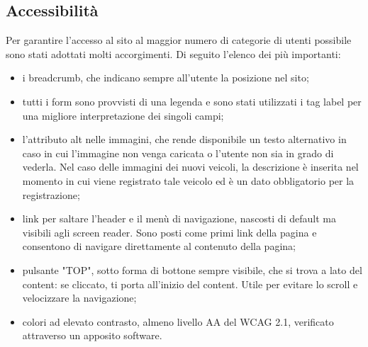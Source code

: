     \subsection{Accessibilità}
    Per garantire l'accesso al sito al maggior numero di categorie di utenti possibile sono stati adottati molti accorgimenti.
    Di seguito l'elenco dei più importanti:
    \begin{itemize}
        \item i breadcrumb, che indicano sempre all'utente la posizione nel sito;
        \item tutti i form sono provvisti di una legenda e sono stati utilizzati i tag label per una migliore interpretazione dei singoli campi;
        \item l'attributo alt nelle immagini, che rende disponibile un testo alternativo in caso in cui l’immagine non venga caricata o l'utente non sia in grado di vederla. Nel caso delle immagini dei nuovi veicoli, la descrizione è inserita nel momento in cui viene registrato tale veicolo ed è un dato obbligatorio per la registrazione;
        \item link per saltare l'header e il menù di navigazione, nascosti di default ma visibili agli screen reader. Sono posti come primi link della pagina e consentono di navigare direttamente al contenuto della pagina;
        \item pulsante "TOP", sotto forma di bottone sempre visibile, che si trova a lato del content: se cliccato, ti porta all’inizio del content. Utile per evitare lo scroll e velocizzare la navigazione;
        \item colori ad elevato contrasto, almeno livello AA del WCAG 2.1, verificato attraverso un apposito software.
    \end{itemize}
\pagebreak